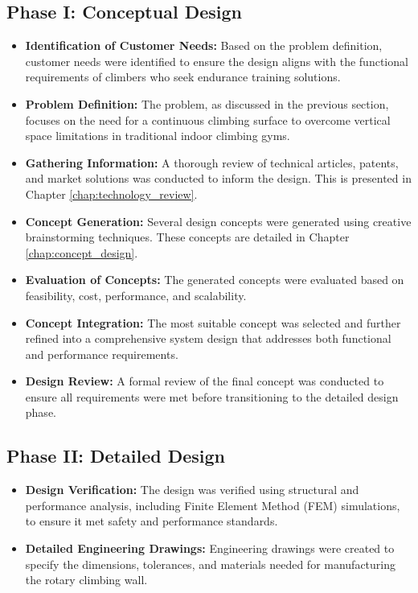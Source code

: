 \subsection{Phase I: Conceptual Design}
\begin{itemize}
    \item \textbf{Identification of Customer Needs:} Based on the problem definition, customer needs were identified to ensure the design aligns with the functional requirements of climbers who seek endurance training solutions.
    \item \textbf{Problem Definition:} The problem, as discussed in the previous section, focuses on the need for a continuous climbing surface to overcome vertical space limitations in traditional indoor climbing gyms.
    \item \textbf{Gathering Information:} A thorough review of technical articles, patents, and market solutions was conducted to inform the design. This is presented in Chapter \ref{chap:technology_review}.
    \item \textbf{Concept Generation:} Several design concepts were generated using creative brainstorming techniques. These concepts are detailed in Chapter \ref{chap:concept_design}.
    \item \textbf{Evaluation of Concepts:} The generated concepts were evaluated based on feasibility, cost, performance, and scalability.
    \item \textbf{Concept Integration:} The most suitable concept was selected and further refined into a comprehensive system design that addresses both functional and performance requirements.
    \item \textbf{Design Review:} A formal review of the final concept was conducted to ensure all requirements were met before transitioning to the detailed design phase.
\end{itemize}

\subsection{Phase II: Detailed Design}
\begin{itemize}
    \item \textbf{Design Verification:} The design was verified using structural and performance analysis, including Finite Element Method (FEM) simulations, to ensure it met safety and performance standards.
    \item \textbf{Detailed Engineering Drawings:} Engineering drawings were created to specify the dimensions, tolerances, and materials needed for manufacturing the rotary climbing wall.
\end{itemize}

